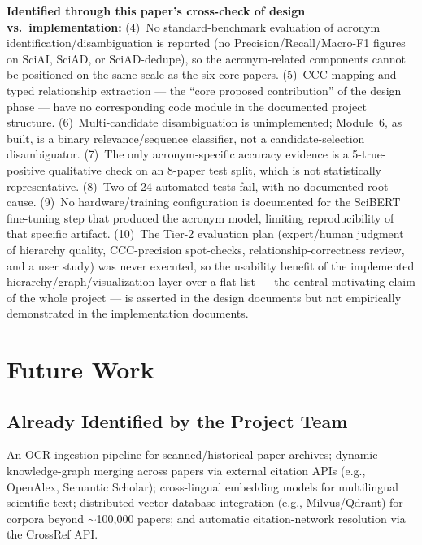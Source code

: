 \documentclass[10pt,conference]{IEEEtran}
\begin{document}
\textbf{Identified through this paper's cross-check of design vs.\ implementation:} (4)~No standard-benchmark evaluation of acronym identification/disambiguation is reported (no Precision/Recall/Macro-F1 figures on SciAI, SciAD, or SciAD-dedupe), so the acronym-related components cannot be positioned on the same scale as the six core papers. (5)~CCC mapping and typed relationship extraction --- the ``core proposed contribution'' of the design phase --- have no corresponding code module in the documented project structure. (6)~Multi-candidate disambiguation is unimplemented; Module~6, as built, is a binary relevance/sequence classifier, not a candidate-selection disambiguator. (7)~The only acronym-specific accuracy evidence is a 5-true-positive qualitative check on an 8-paper test split, which is not statistically representative. (8)~Two of 24 automated tests fail, with no documented root cause. (9)~No hardware/training configuration is documented for the SciBERT fine-tuning step that produced the acronym model, limiting reproducibility of that specific artifact. (10)~The Tier-2 evaluation plan (expert/human judgment of hierarchy quality, CCC-precision spot-checks, relationship-correctness review, and a user study) was never executed, so the usability benefit of the implemented hierarchy/graph/visualization layer over a flat list --- the central motivating claim of the whole project --- is asserted in the design documents but not empirically demonstrated in the implementation documents.

\section{Future Work}
\label{sec:future}
\subsection{Already Identified by the Project Team}
An OCR ingestion pipeline for scanned/historical paper archives; dynamic knowledge-graph merging across papers via external citation APIs (e.g., OpenAlex, Semantic Scholar); cross-lingual embedding models for multilingual scientific text; distributed vector-database integration (e.g., Milvus/Qdrant) for corpora beyond $\sim$100{,}000 papers; and automatic citation-network resolution via the CrossRef API.
\end{document}
